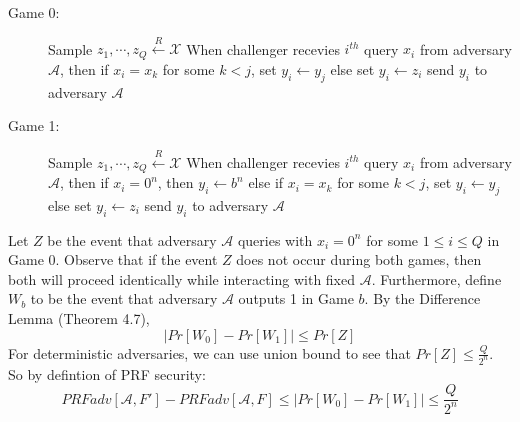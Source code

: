 \documentclass[11pt]{article}
\begin{document}
\begin{enumerate}
  \begin{description}
    \item[Game 0:]
          Sample $z_1, \cdots, z_Q \xleftarrow{R} \mathcal{X}$ \newline
          When challenger recevies $i^{th}$ query $x_i$ from adversary $\mathcal{A}$, then \newline
          if $x_i = x_k$ for some $k < j$, set $y_i \leftarrow y_j $ \newline
          else set $y_i \leftarrow z_i$
          send $y_i$ to adversary $\mathcal{A}$
    \item[Game 1:]
      Sample $z_1, \cdots, z_Q \xleftarrow{R} \mathcal{X}$ \newline
      When challenger recevies $i^{th}$ query $x_i$ from adversary $\mathcal{A}$, then \newline
      if $x_i = 0^n$, then $y_i \leftarrow b^n$ \newline
      else if $x_i = x_k$ for some $k < j$, set $y_i \leftarrow y_j $ \newline
      else set $y_i \leftarrow z_i$
      send $y_i$ to adversary $\mathcal{A}$
  \end{description}
  Let $Z$ be the event that adversary $\mathcal{A}$ queries with $x_i = 0^n$ for some $1 \leq i \leq Q$ in Game 0. Observe that if the event $Z$ does not occur during both games, then both will proceed identically while interacting with fixed $\mathcal{A}$. Furthermore, define $W_b$ to be the event that adversary $\mathcal{A}$ outputs 1 in Game $b$. By the Difference Lemma (Theorem 4.7),
  \[ |Pr[W_0] - Pr[W_1]| \leq Pr[Z]\]
  For deterministic adversaries, we can use union bound to see that $Pr[Z] \leq \frac{Q}{2^n}$. So by defintion of PRF security:
  \[ PRFadv[\mathcal{A}, F'] - PRFadv[\mathcal{A}, F]  \leq |Pr[W_0] - Pr[W_1]| \leq \frac{Q}{2^n} \]


\end{enumerate}
\end{document}
